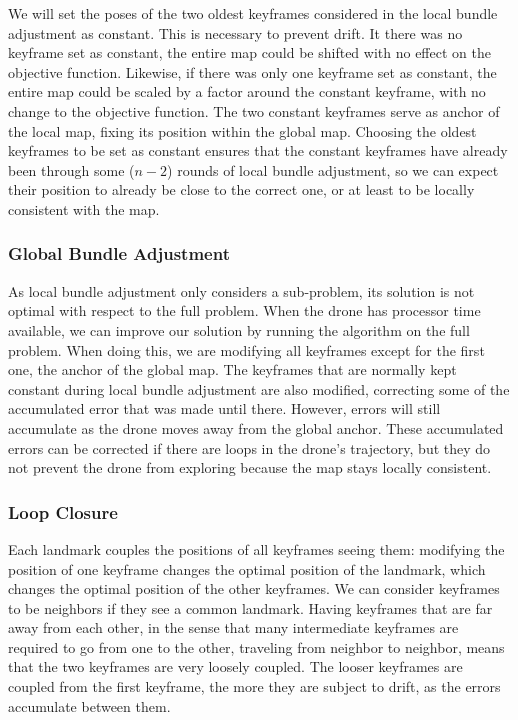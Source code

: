 We will set the poses of the two oldest keyframes considered in the local bundle adjustment as constant. This is necessary to prevent drift. It there was no keyframe set as constant, the entire map could be shifted with no effect on the objective function. Likewise, if there was only one keyframe set as constant, the entire map could be scaled by a factor around the constant keyframe, with no change to the objective function. The two constant keyframes serve as anchor of the local map, fixing its position within the global map. Choosing the oldest keyframes to be set as constant ensures that the constant keyframes have already been through some ($n - 2$) rounds of local bundle adjustment, so we can expect their position to already be close to the correct one, or at least to be locally consistent with the map.

\subsubsection{Global Bundle Adjustment}
As local bundle adjustment only considers a sub-problem, its solution is not optimal with respect to the full problem. When the drone has processor time available, we can improve our solution by running the algorithm on the full problem. When doing this, we are modifying all keyframes except for the first one, the anchor of the global map. The keyframes that are normally kept constant during local bundle adjustment are also modified, correcting some of the accumulated error that was made until there. However, errors will still accumulate as the drone moves away from the global anchor. These accumulated errors can be corrected if there are loops in the drone's trajectory, but they do not prevent the drone from exploring because the map stays locally consistent.


\subsubsection{Loop Closure}
Each landmark couples the positions of all keyframes seeing them: modifying the position of one keyframe changes the optimal position of the landmark, which changes the optimal position of the other keyframes. We can consider keyframes to be neighbors if they see a common landmark. Having keyframes that are far away from each other, in the sense that many intermediate keyframes are required to go from one to the other, traveling from neighbor to neighbor, means that the two keyframes are very loosely coupled. The looser keyframes are coupled from the first keyframe, the more they are subject to drift, as the errors accumulate between them.\\

